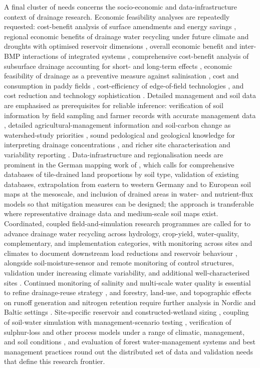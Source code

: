 A final cluster of needs concerns the socio-economic and data-infrastructure
context of drainage research. Economic feasibility analyses are repeatedly
requested: cost-benefit analysis of surface amendments and energy savings
\parencite{Wamono2016b}, regional economic benefits of drainage water recycling
under future climate and droughts with optimised reservoir dimensions
\parencite{Kosari2024}, overall economic benefit and inter-BMP interactions of
integrated systems \parencite{Li2021b}, comprehensive cost-benefit analysis of
subsurface drainage accounting for short- and long-term effects
\parencite{Guo2025}, economic feasibility of drainage as a preventive measure
against salinisation \parencite{Datta2000,HalbacCotoaraZamfir2022}, cost and
consumption in paddy fields \parencite{Jia2023}, cost-efficiency of edge-of-field
technologies \parencite{Mendes2020}, and cost reduction and technology
sophistication \parencite{Okuda2020}. Detailed management and soil data are
emphasised as prerequisites for reliable inference: verification of soil
information by field sampling and farmer records with accurate management data
\parencite{JORJANI1991}, detailed agricultural-management information and soil-carbon
change as watershed-study priorities \parencite{Williams2017}, sound pedological
and geological knowledge for interpreting drainage concentrations
\parencite{Jacobsen2007}, and richer site characterisation and variability
reporting \parencite{Singh2022b}. Data-infrastructure and regionalisation needs are
prominent in the German mapping work of \textcite{Hirt2005,Hirt2005b,Hirt2011},
which calls for comprehensive databases of tile-drained land proportions by soil
type, validation of existing databases, extrapolation from eastern to western
Germany and to European soil maps at the mesoscale, and inclusion of drained areas
in water- and nutrient-flux models so that mitigation measures can be designed; the
approach is transferable where representative drainage data and medium-scale soil
maps exist. Coordinated, coupled field-and-simulation research programmes are
called for to advance drainage water recycling across hydrology, crop-yield,
water-quality, complementary, and implementation categories, with monitoring across
sites and climates to document downstream load reductions and reservoir behaviour
\parencite{Hay2021}, alongside soil-moisture-sensor and remote monitoring of
control structures, validation under increasing climate variability, and
additional well-characterised sites \parencite{Willison2021}. Continued monitoring
of salinity and multi-scale water quality is essential to refine drainage-reuse
strategy \parencite{ElAgha2020}, and forestry, land-use, and topographic effects on
runoff generation and nitrogen retention require further analysis in Nordic and
Baltic settings \parencite{Deelstra2014,Deelstra2014b}. Site-specific reservoir and
constructed-wetland sizing \parencite{Haverstock2017}, coupling of soil-water
simulation with management-scenario testing \parencite{Bulot2017}, verification of
sulphur-loss and other process models under a range of climatic, management, and
soil conditions \parencite{SMITH1983}, and evaluation of forest water-management
systems and best management practices \parencite{MCCARTHY1992} round out the
distributed set of data and validation needs that define this research frontier.